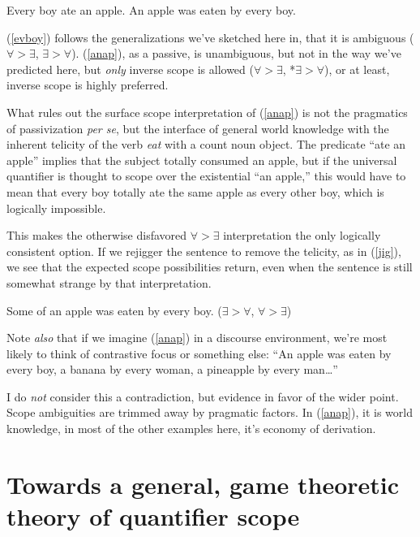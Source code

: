 \documentclass{article}
\begin{document}
\begin{exe}
\ex Every boy ate an apple.\label{evboy}
\ex An apple was eaten by every boy.\label{anap}
\end{exe}

(\ref{evboy}) follows the generalizations we've sketched here in, that it is ambiguous ($\forall>\exists$, $\exists>\forall$). (\ref{anap}), as a passive, is unambiguous, but not in the way we've predicted here, but \emph{only} inverse scope is allowed ($\forall>\exists$, *$\exists>\forall$), or at least, inverse scope is highly preferred.


What rules out the surface scope interpretation of (\ref{anap}) is not the pragmatics of passivization \emph{per se}, but the interface of general world knowledge with the inherent telicity of the verb \emph{eat} with a count noun object. The predicate ``ate an apple'' implies that the subject totally consumed an apple, but if the universal quantifier is thought to scope over the existential ``an apple,'' this would have to mean that every boy totally ate the same apple as every other boy, which is logically impossible.

This makes the otherwise disfavored $\forall>\exists$ interpretation the only logically consistent option. If we rejigger the sentence to remove the telicity, as in (\ref{jig}), we see that the expected scope possibilities return, even when the sentence is still somewhat strange by that interpretation.

\begin{exe}
\ex Some of an apple was eaten by every boy. \hfill ($\exists>\forall$, $\forall>\exists$)\label{jig}
\end{exe}

Note \emph{also} that if we imagine (\ref{anap}) in a discourse environment, we're most likely to think of contrastive focus or something else: ``An apple was eaten by every boy, a banana by every woman, a pineapple by every man\ldots'' 

I do \emph{not} consider this a contradiction, but evidence in favor of the wider point.
Scope ambiguities are trimmed away by pragmatic factors. In (\ref{anap}), it is world knowledge, in most of the other examples here, it's economy of derivation.

\section{Towards a general, game theoretic theory of quantifier scope}
\end{document}
